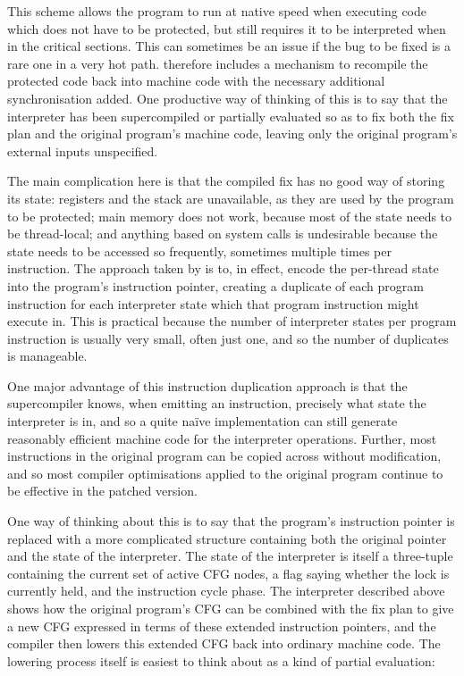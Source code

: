 This scheme allows the program to run at native speed when executing
code which does not have to be protected, but still requires it to be
interpreted when in the critical sections.  This can sometimes be an
issue if the bug to be fixed is a rare one in a very hot path.
{\Implementation} therefore includes a mechanism to recompile the
protected code back into machine code with the necessary additional
synchronisation added.  One productive way of thinking of this is to
say that the interpreter has been supercompiled or partially evaluated
so as to fix both the fix plan and the original program's machine
code, leaving only the original program's external inputs unspecified.

The main complication here is that the compiled fix has no good way of
storing its state: registers and the stack are unavailable, as they
are used by the program to be protected; main memory does not work,
because most of the state needs to be thread-local; and anything based
on system calls is undesirable because the state needs to be accessed
so frequently, sometimes multiple times per instruction.  The approach
taken by {\implementation} is to, in effect, encode the per-thread
state into the program's instruction pointer, creating a duplicate of
each program instruction for each interpreter state which that program
instruction might execute in.  This is practical because the number of
interpreter states per program instruction is usually very small,
often just one, and so the number of duplicates is manageable.

One major advantage of this instruction duplication approach is that
the supercompiler knows, when emitting an instruction, precisely what
state the interpreter is in, and so a quite na\"ive implementation can
still generate reasonably efficient machine code for the interpreter
operations.  Further, most instructions in the original program can be
copied across without modification, and so most compiler optimisations
applied to the original program continue to be effective in the
patched version.

One way of thinking about this is to say that the program's
instruction pointer is replaced with a more complicated structure
containing both the original pointer and the state of the interpreter.
The state of the interpreter is itself a three-tuple containing the
current set of active CFG nodes, a flag saying whether the lock is
currently held, and the instruction cycle phase.  The interpreter
described above shows how the original program's CFG can be combined
with the fix plan to give a new CFG expressed in terms of these
extended instruction pointers, and the compiler then lowers this
extended CFG back into ordinary machine code.  The lowering process
itself is easiest to think about as a kind of partial evaluation:

